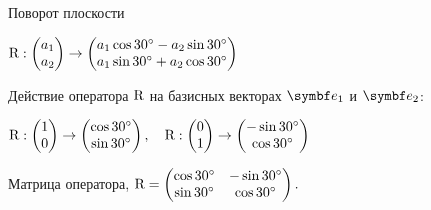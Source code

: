 \begin{frame}{Поворот плоскости}

$\mathrm{R} : \begin{pmatrix}
  a_1 \\
  a_2 \\
\end{pmatrix} \to 
\begin{pmatrix}
  a_1\cos 30^{\circ} - a_2 \sin 30^{\circ}  \\
  a_1\sin 30^{\circ} + a_2 \cos 30^{\circ}  \\
\end{pmatrix}$

\pause

Действие оператора $\mathrm{R}$ на базисных векторах $\be_1$ и $\be_2$:

$\mathrm{R} : \begin{pmatrix}
  1 \\
  0 \\
\end{pmatrix} \to 
\begin{pmatrix}
\cos 30^{\circ}  \\
\sin 30^{\circ}  \\
\end{pmatrix}, \quad
\mathrm{R} : \begin{pmatrix}
  0 \\
  1 \\
\end{pmatrix} \to 
\begin{pmatrix}
 -\sin 30^{\circ}  \\
 \cos 30^{\circ} \\
\end{pmatrix}$

\pause

Матрица оператора, $\mathrm{R} = 
\begin{pmatrix}
  \cos 30^{\circ} & -\sin 30^{\circ}  \\
  \sin 30^{\circ} & \cos 30^{\circ} \\
\end{pmatrix}.$



\end{frame}
    


